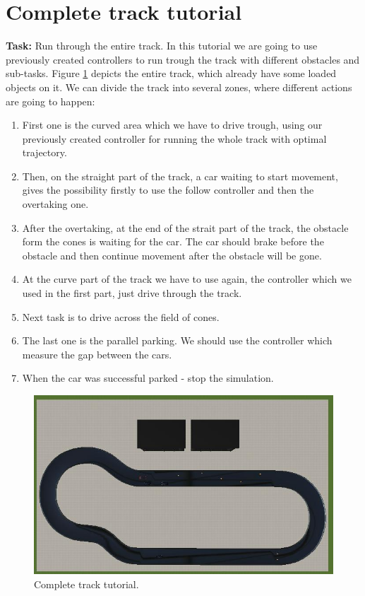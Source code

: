\section{Complete track tutorial}
\textbf{Task:} Run through the entire track. \newline \newline
In this tutorial we are going to use previously created controllers to run trough the track with different obstacles and sub-tasks. Figure \ref{fig:tutorial11-track} depicts the entire track, which already have some loaded objects on it. We can divide the track into several zones, where different actions are going to happen:
\begin{enumerate}
    \item First one is the curved area which we have to drive trough, using our previously created controller for running the whole track with optimal trajectory.
    \item Then, on the straight part of the track, a car waiting to start movement, gives the possibility firstly to use the follow controller and then the overtaking one.
    \item After the overtaking, at the end of the strait part of the track, the obstacle form the cones is waiting for the car. The car should brake before the obstacle and then continue movement after the obstacle will be gone.
    \item At the curve part of the track we have to use again, the controller which we used in the first part, just drive through the track.
    \item Next task is to drive across the field of cones.
    \item The last one is the parallel parking. We should use the controller which measure the gap between the cars.
    \item When the car was successful parked - stop the simulation.
\end{enumerate}
\begin{figure}[ht]
    \centering
    \includegraphics[width=\linewidth]{src/pic/track_tutorial11}
    \caption{Complete track tutorial.}
    \label{fig:tutorial11-track}
\end{figure}
